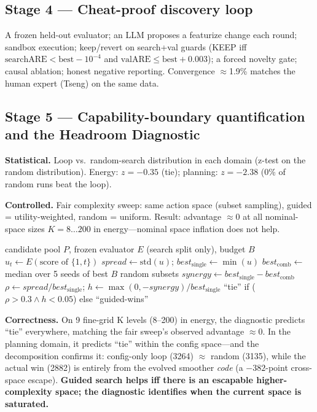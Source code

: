 \documentclass{article}
\begin{document}
\subsection{Stage 4 --- Cheat-proof discovery loop}
\label{sec:stage4}
A frozen held-out evaluator; an LLM proposes a featurize change each round; sandbox
execution; keep/revert on search+val guards (KEEP iff $\mathrm{searchARE} <
\mathrm{best} - 10^{-4}$ and $\mathrm{valARE} \le \mathrm{best} + 0.003$); a forced
novelty gate; causal ablation; honest negative reporting. Convergence $\approx$1.9\%
matches the human expert (Tseng) on the same data.

\subsection{Stage 5 --- Capability-boundary quantification and the Headroom Diagnostic}
\label{sec:stage5}

\textbf{Statistical.} Loop vs.\ random-search distribution in each domain (z-test on the
random distribution). Energy: $z=-0.35$ (tie); planning: $z=-2.38$ (0\% of random runs
beat the loop).

\textbf{Controlled.} Fair complexity sweep: same action space (subset sampling), guided
= utility-weighted, random = uniform. Result: advantage $\approx 0$ at all nominal-space
sizes $K = 8\ldots 200$ in energy---nominal space inflation does not help.

\begin{algorithm}[t]
\caption{Headroom Diagnostic (pre-loop prediction)}
\label{alg:headroom}
\begin{algorithmic}[1]
\Require candidate pool $P$, frozen evaluator $E$ (search split only), budget $B$
  \State $u_t \gets E(\text{score of } \{1, t\})$ 
\EndFor
\State $\mathit{spread} \gets \mathrm{std}(u)$;\; $\mathit{best}_{\mathrm{single}} \gets \min(u)$
\State $\mathit{best}_{\mathrm{comb}} \gets$ median over 5 seeds of best $B$ random subsets
\State $\mathit{synergy} \gets \mathit{best}_{\mathrm{single}} - \mathit{best}_{\mathrm{comb}}$
\State $\rho \gets \mathit{spread}/\mathit{best}_{\mathrm{single}}$;\; $h \gets \max(0,-\mathit{synergy})/\mathit{best}_{\mathrm{single}}$
\State \Return ``tie'' if ($\rho > 0.3 \land h < 0.05$) else ``guided-wins''
\end{algorithmic}
\end{algorithm}

\textbf{Correctness.} On 9 fine-grid K levels (8--200) in energy, the diagnostic predicts
``tie'' everywhere, matching the fair sweep's observed advantage $\approx 0$. In the
planning domain, it predicts ``tie'' within the config space---and the decomposition
confirms it: config-only loop (3264) $\approx$ random (3135), while the actual win (2882)
is entirely from the evolved smoother \emph{code} (a $-382$-point cross-space escape).
\textbf{Guided search helps iff there is an escapable higher-complexity space; the
diagnostic identifies when the current space is saturated.}
\end{document}
